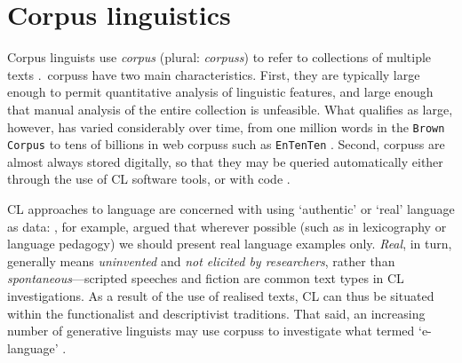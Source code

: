 
\section{Corpus linguistics} \label{sect:cl}



Corpus linguists use \emph{\gls{corpus}} (plural: \emph{\glspl{corpus}}) to refer to collections of multiple texts \cite{mcenery_corpus_1996}.~\Glspl{corpus} have two main characteristics. First, they are typically large enough to permit quantitative analysis of linguistic features, and large enough that manual analysis of the entire collection is unfeasible. What qualifies as large, however, has varied considerably over time, from one million words in the \texttt{Brown Corpus} \cite[see][]{francis1979brown} to tens of billions in web \glspl{corpus} such as \texttt{EnTenTen} \cite[see][]{jakubivcek2013tenten}. Second, \glspl{corpus} are almost always stored digitally, so that they may be queried automatically either through the use of \gls{CL} software tools, or with code \cite{butler_corpus_2004}.

\gls{CL} approaches to language are concerned with using `authentic' or `real' language as data: \textcite{sinclair_corpus_1997}, for example, argued that wherever possible (such as in lexicography or language pedagogy) we should present real language examples only. \emph{Real}, in turn, generally means \emph{uninvented} and \emph{not elicited by researchers}, rather than \emph{spontaneous}---scripted speeches and fiction are common text types in \gls{CL} investigations. As a result of the use of realised texts, \gls{CL} can thus be situated within the functionalist and descriptivist traditions. That said, an increasing number of generative linguists may use \glspl{corpus} to investigate what \textcite{chomsky_knowledge_1986} termed `e\hyp{}language' \cite{meyer_english_2002}.

